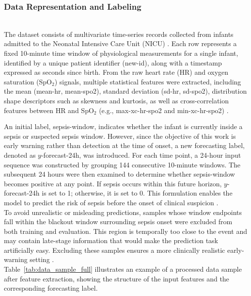\documentclass[conference]{IEEEtran}
\begin{document}
\subsubsection{Data Representation and Labeling}\\
The dataset consists of multivariate time-series records collected from infants admitted to the Neonatal Intensive Care Unit (NICU) \cite{hero_monitoring,plos_ehr_sepsis}. Each row represents a fixed 10-minute time window of physiological measurements for a single infant, identified by a unique patient identifier (new-id), along with a timestamp expressed as seconds since birth. From the raw heart rate (HR) and oxygen saturation (SpO$_2$) signals, multiple statistical features were extracted, including the mean (mean-hr, mean-spo2), standard deviation (sd-hr, sd-spo2), distribution shape descriptors such as skewness and kurtosis, as well as cross-correlation features between HR and SpO$_2$ (e.g., max-xc-hr-spo2 and min-xc-hr-spo2) \cite{vital_sign_ml}.

An initial label, sepsis-window, indicates whether the infant is currently inside a sepsis or suspected sepsis window. However, since the objective of this work is early warning rather than detection at the time of onset, a new forecasting label, denoted as $y$-forecast-24h, was introduced. For each time point, a 24-hour input sequence was constructed by grouping 144 consecutive 10-minute windows. The subsequent 24 hours were then examined to determine whether sepsis-window becomes positive at any point. If sepsis occurs within this future horizon, $y$-forecast-24h is set to 1; otherwise, it is set to 0. This formulation enables the model to predict the risk of sepsis before the onset of clinical suspicion \cite{ehr_rnn_sepsis,los_ml_mdpi}.\\

To avoid unrealistic or misleading predictions, samples whose window endpoints fall within the blackout window surrounding sepsis onset were excluded from both training and evaluation. This region is temporally too close to the event and may contain late-stage information that would make the prediction task artificially easy. Excluding these samples ensures a more clinically realistic early-warning setting \cite{plos_ehr_sepsis}.\\

Table~\ref{tab:data_sample_full} illustrates an example of a processed data sample after feature extraction, showing the structure of the input features and the corresponding forecasting label.\\
\end{document}
